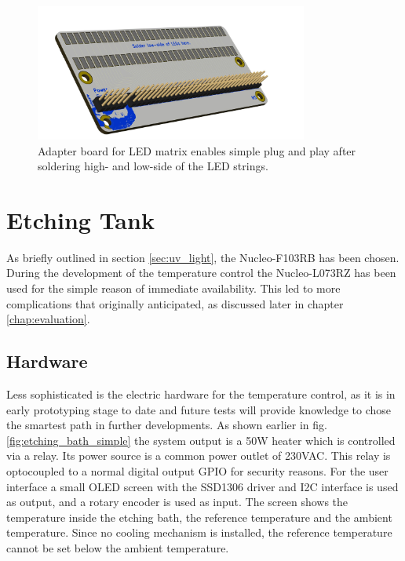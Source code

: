 \begin{figure}[H]                                                         
\centering          
\includegraphics[width=0.8\textwidth]{./fig/3d_pic_2}   
\caption[Adapter board for \gls{LED} matrix enables simple plug and play.]{Adapter board for \gls{LED} matrix enables simple plug and play after soldering high- and low-side of the \gls{LED} strings.}   
\label{fig:adapter_board}                                                       
\end{figure} 


\section{Etching Tank}
\label{sec:etching_tank}
As briefly outlined in section \ref{sec:uv_light}, the Nucleo-F103RB has been chosen. During the development of the temperature control the Nucleo-L073RZ has been used for the simple reason of immediate availability. This led to more complications that originally anticipated, as discussed later in chapter \ref{chap:evaluation}.

\subsection{Hardware}
\label{subsec:etching_tank_hw}
Less sophisticated is the electric hardware for the temperature control, as it is in early prototyping stage to date and future tests will provide knowledge to chose the smartest path in further developments.
As shown earlier in fig. \ref{fig:etching_bath_simple} the system output is a 50W heater which is controlled via a relay. Its power source is a common power outlet of 230VAC. This relay is optocoupled to a normal digital output GPIO for security reasons.
For the user interface a small OLED screen with the SSD1306 driver and I2C interface is used as output, and a rotary encoder is used as input. The screen shows the temperature inside the etching bath, the reference temperature and the ambient temperature.
Since no cooling mechanism is installed, the reference temperature cannot be set below the ambient temperature.

